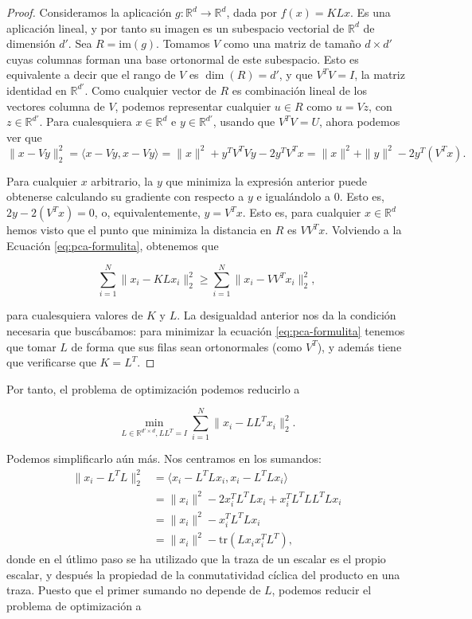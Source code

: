 \begin{proof}
    Consideramos la aplicación $g\colon \mathbb{R}^d \to \mathbb{R}^d$, dada por $f(x) = KLx$. Es una aplicación lineal, y por tanto su imagen es un subespacio vectorial de $\mathbb{R}^d$ de dimensión $d'$. Sea $R = \text{im}(g)$. Tomamos $V$ como una matriz de tamaño $d \times d'$ cuyas columnas forman una base ortonormal de este subespacio. Esto es equivalente a decir que el rango de $V$ es $\dim(R) = d'$, y que $V^TV = I$, la matriz identidad en $\mathbb{R}^{d'}$. Como cualquier vector de $R$ es combinación lineal de los vectores columna de $V$, podemos representar cualquier $u \in R$ como $u = Vz$, con $z \in \mathbb{R}^{d'}$. Para cualesquiera $x \in \mathbb{R}^d$ e $y \in \mathbb{R}^{d'}$, usando que $V^TV = U$, ahora podemos ver que \[\|x - Vy\|_2^2 = \langle x - Vy, x - Vy \rangle = \|x\|^2 + y^TV^TVy - 2y^TV^Tx = \|x\|^2 + \|y\|^2 - 2y^T(V^Tx).\]

    Para cualquier $x$ arbitrario, la $y$ que minimiza la expresión anterior puede obtenerse calculando su gradiente con respecto a $y$ e igualándolo a 0. Esto es, $2y - 2(V^Tx) = 0$, o, equivalentemente, $y = V^Tx$. Esto es, para cualquier $x \in \mathbb{R}^d$ hemos visto que el punto que minimiza la distancia en $R$ es $VV^Tx$. Volviendo a la Ecuación \eqref{eq:pca-formulita}, obtenemos que

    \[ \sum_{i=1}^N \|x_i - KLx_i \|^2_2 \ge \sum_{i=1}^N \|x_i - VV^Tx_i\|_2^2, \]

    para cualesquiera valores de $K$ y $L$. La desigualdad anterior nos da la condición necesaria que buscábamos:  para minimizar la ecuación \eqref{eq:pca-formulita} tenemos que tomar $L$ de forma que sus filas sean ortonormales (como $V^T$), y además tiene que verificarse que $K = L^T$.
\end{proof}

Por tanto, el problema de optimización podemos reducirlo a

\begin{equation}
 \min_{L \in \mathbb{R}^{d'\times d}, LL^T=I} \sum_{i=1}^N \|x_i - LL^Tx_i \|_2^2.
\end{equation}

Podemos simplificarlo aún más. Nos centramos en los sumandos:
\begin{align*}
    \|x_i - L^TL\|_2^2 &= \langle x_i - L^TLx_i, x_i - L^TLx_i\rangle \\
                       &= \|x_i\|^2 - 2x_i^TL^TLx_i + x_i^TL^TLL^TLx_i \\
                       &= \|x_i\|^2 - x_i^TL^TLx_i \\
                       &= \|x_i\|^2 - \text{tr}(Lx_ix_i^TL^T),
\end{align*}
donde en el útlimo paso se ha utilizado que la traza de un escalar es el propio escalar, y después la propiedad de la conmutatividad cíclica del producto en una traza. Puesto que el primer sumando no depende de $L$, podemos reducir el problema de optimización a

